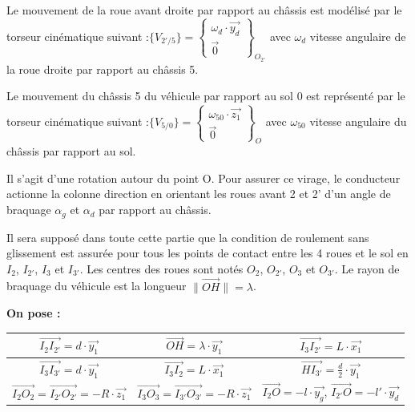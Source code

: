 \medskip
Le mouvement de la roue avant droite par rapport au châssis est modélisé par le torseur cinématique suivant :$
\{V_{2'/5}\} = \left\{\begin{array}{c} \omega_d\cdot\overrightarrow{y_d} \\ \overrightarrow{0} \end{array}\right\}_{O_{2'}}$ avec $\omega_d$ vitesse angulaire de la roue droite par rapport au châssis 5.

\medskip
Le mouvement du châssis 5 du véhicule par rapport au sol 0 est représenté par le torseur cinématique suivant :$\{V_{5/0}\} = \left\{\begin{array}{c} \omega_{50}\cdot\overrightarrow{z_1} \\ \overrightarrow{0} \end{array}\right\}_{O}$ avec $\omega_{50}$ vitesse angulaire du châssis par rapport au sol.

\medskip
Il s'agit d'une rotation autour du point O. Pour assurer ce virage, le conducteur actionne la colonne direction en orientant les roues avant 2 et 2' d'un angle de braquage $\alpha_g$ et $\alpha_d$ par rapport au châssis.

\medskip
Il sera supposé dans toute cette partie que la condition de roulement sans glissement est assurée pour tous les points de contact entre les 4 roues et le sol en $I_2$, $I_{2'}$, $I_3$ et $I_{3'}$. Les centres des roues sont notés $O_2$, $O_{2'}$, $O_3$ et $O_{3'}$. Le rayon de braquage du véhicule est la longueur $\|\overrightarrow{OH}\| = \lambda$.

\textbf{On pose :}
\begin{center}
\renewcommand{\arraystretch}{1.5}
\begin{tabular}{|c|c|c|}
\hline
$\overrightarrow{I_2I_{2'}} = d\cdot\overrightarrow{y_1}$ & $\overrightarrow{OH} = \lambda\cdot\overrightarrow{y_1}$ & $\overrightarrow{I_3I_{2'}} = L\cdot\overrightarrow{x_1}$ \\
\hline
$\overrightarrow{I_3I_{3'}} = d\cdot\overrightarrow{y_1}$ & $\overrightarrow{I_3I_2} = L\cdot\overrightarrow{x_1}$ & $\overrightarrow{HI_{3'}} = \frac{d}{2}\cdot\overrightarrow{y_1}$ \\
\hline
$\overrightarrow{I_2O_2} = \overrightarrow{I_{2'}O_{2'}} = -R\cdot\overrightarrow{z_1}$ & $\overrightarrow{I_3O_3} = \overrightarrow{I_{3'}O_{3'}} = -R\cdot\overrightarrow{z_1}$ & $\overrightarrow{I_2O} = -l\cdot\overrightarrow{y_g}$, $\overrightarrow{I_{2'}O} = -l'\cdot\overrightarrow{y_d}$ \\
\hline
\end{tabular}
\end{center}

